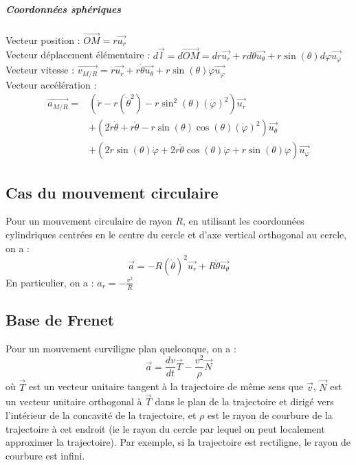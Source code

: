 \documentclass[french]{book}
\theoremstyle{plain}
\theoremstyle{definition}
\theoremstyle{remark}
\begin{document}
\subparagraph{Coordonnées sphériques}
Vecteur position : $\overrightarrow{OM}=r\overrightarrow{u_r}$ \\
Vecteur déplacement élémentaire : $d\overrightarrow{l}=d\overrightarrow{OM}=dr\overrightarrow{u_r}+rd\theta\overrightarrow{u_\theta}+r\sin(\theta)d\varphi\overrightarrow{u_\varphi}$ \\
Vecteur vitesse : $\overrightarrow{v_{M/R}}=\dot{r}\overrightarrow{u_r}+r\dot{\theta}\overrightarrow{u_\theta}+r\sin(\theta)\dot{\varphi}\overrightarrow{u_\varphi}$ \\
Vecteur accélération :
\begin{align*}
	\overrightarrow{a_{M/R}}=&\left(\ddot{r}-r(\dot{\theta}^2)-r\sin^2(\theta)(\dot{\varphi})^2\right)\overrightarrow{u_r} \\ &+\left(2\dot{r}\dot{\theta}+r\ddot{\theta}-r\sin(\theta)\cos(\theta)(\dot{\varphi})^2\right)\overrightarrow{u_\theta}\\
	&+\left(2\dot{r}\sin(\theta)\dot{\varphi}+2r\dot{\theta}\cos(\theta)\dot{\varphi}+r\sin(\theta)\ddot{\varphi}\right)\overrightarrow{u_\varphi}
\end{align*} 
\subsection{Cas du mouvement circulaire}
Pour un mouvement circulaire de rayon $R$, en utilisant les coordonnées cylindriques centrées en le centre du cercle et d'axe vertical orthogonal au cercle, on a : $$\overrightarrow{a}=-R(\dot{\theta})^2\overrightarrow{u_r}+R\ddot{\theta}\overrightarrow{u_\theta}$$
En particulier, on a : $\displaystyle a_r=-\frac{v^2}{R}$

\subsection{Base de Frenet}
Pour un mouvement curviligne plan quelconque, on a : $$\overrightarrow{a}=\frac{dv}{dt}\overrightarrow{T}-\frac{v^2}{\rho}\overrightarrow{N}$$ où $\overrightarrow{T}$ est un vecteur unitaire tangent à la trajectoire de même sens que $\overrightarrow{v}$, $\overrightarrow{N}$ est un vecteur unitaire orthogonal à $\overrightarrow{T}$ dans le plan de la trajectoire et dirigé vers l'intérieur de la concavité de la trajectoire, et $\rho$ est le rayon de courbure de la trajectoire à cet endroit (ie le rayon du cercle par lequel on peut localement approximer la trajectoire). Par exemple, si la trajectoire est rectiligne, le rayon de courbure est infini.
\end{document}
